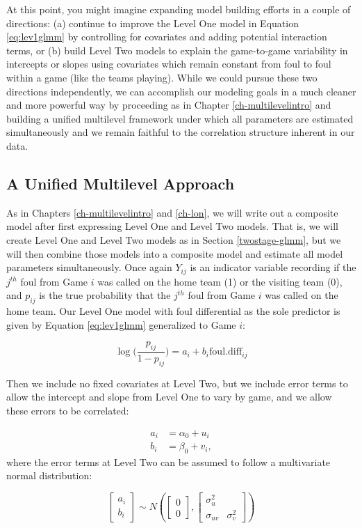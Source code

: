 \documentclass[
]{krantz}
\begin{document}
At this point, you might imagine expanding model building efforts in a couple of directions: (a) continue to improve the Level One model in Equation \eqref{eq:lev1glmm} by controlling for covariates and adding potential interaction terms, or (b) build Level Two models to explain the game-to-game variability in intercepts or slopes using covariates which remain constant from foul to foul within a game (like the teams playing). While we could pursue these two directions independently, we can accomplish our modeling goals in a much cleaner and more powerful way by proceeding as in Chapter \ref{ch-multilevelintro} and building a unified multilevel framework under which all parameters are estimated simultaneously and we remain faithful to the correlation structure inherent in our data.

\subsection{A Unified Multilevel Approach}\label{unified-glmm}

As in Chapters \ref{ch-multilevelintro} and \ref{ch-lon}, we will write out a composite model after first expressing Level One and Level Two models. That is, we will create Level One and Level Two models as in Section \ref{twostage-glmm}, but we will then combine those models into a composite model and estimate all model parameters simultaneously. Once again \(Y_{ij}\) is an indicator variable recording if the \(j^{th}\) foul from Game \(i\) was called on the home team (1) or the visiting team (0), and \(p_{ij}\) is the true probability that the \(j^{th}\) foul from Game \(i\) was called on the home team. Our Level One model with foul differential as the sole predictor is given by Equation \eqref{eq:lev1glmm} generalized to Game \(i\):

\[ \log\bigg(\frac{p_{ij}}{1-p_{ij}}\bigg)=a_i+b_i\mathrm{foul.diff}_{ij} \]

Then we include no fixed covariates at Level Two, but we include error terms to allow the intercept and slope from Level One to vary by game, and we allow these errors to be correlated:

\begin{align*}
a_i & = \alpha_{0}+u_i \\
b_i & = \beta_{0}+v_i,
\end{align*}
where the error terms at Level Two can be assumed to follow a multivariate normal distribution:

\[ \left[ \begin{array}{c}
            a_i \\ b_i
          \end{array}  \right] \sim N \left( \left[
          \begin{array}{c}
            0 \\ 0
          \end{array} \right], \left[
          \begin{array}{cc}
            \sigma_{u}^{2} & \\
            \sigma_{uv} & \sigma_{v}^{2}
          \end{array} \right] \right) \]
\end{document}
